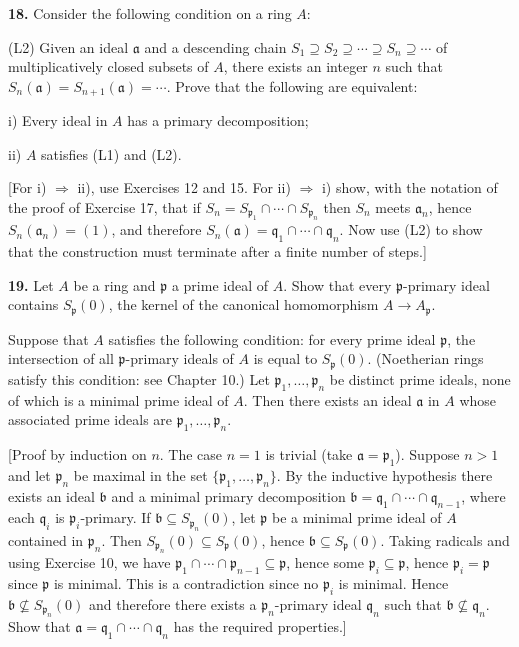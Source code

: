\medskip
\noindent\textbf{18.} Consider the following condition on a ring $A$:

(L2) Given an ideal $\mathfrak a$ and a descending chain $S_1\supseteq S_2\supseteq\cdots\supseteq S_n\supseteq\cdots$
of multiplicatively closed subsets of $A$, there exists an integer $n$ such that $S_n(\mathfrak a)=
S_{n+1}(\mathfrak a)=\cdots$.  Prove that the following are equivalent:

i) Every ideal in $A$ has a primary decomposition;

ii) $A$ satisfies (L1) and (L2).

[For i) $\Rightarrow$ ii), use Exercises 12 and 15.  For ii) $\Rightarrow$ i) show, with the notation of
the proof of Exercise 17, that if $S_n=S_{\mathfrak p_1}\cap\cdots\cap S_{\mathfrak p_n}$ then $S_n$ meets $\mathfrak a_n$, hence
$S_n(\mathfrak a_n)=(1)$, and therefore $S_n(\mathfrak a)=\mathfrak q_1\cap\cdots\cap\mathfrak q_n$.  Now use (L2) to show that
the construction must terminate after a finite number of steps.]

\medskip
\noindent\textbf{19.} Let $A$ be a ring and $\mathfrak p$ a prime ideal of $A$.  Show that every $\mathfrak p$-primary ideal
contains $S_\mathfrak p(0)$, the kernel of the canonical homomorphism $A\longrightarrow A_\mathfrak p$.

Suppose that $A$ satisfies the following condition: for every prime ideal $\mathfrak p$, the
intersection of all $\mathfrak p$-primary ideals of $A$ is equal to $S_\mathfrak p(0)$.  (Noetherian rings
satisfy this condition: see Chapter 10.)  Let $\mathfrak p_1,\ldots,\mathfrak p_n$ be distinct prime ideals,
none of which is a minimal prime ideal of $A$.  Then there exists an ideal $\mathfrak a$ in $A$
whose associated prime ideals are $\mathfrak p_1,\ldots,\mathfrak p_n$.

[Proof by induction on $n$.  The case $n=1$ is trivial (take $\mathfrak a=\mathfrak p_1$).  Suppose
$n>1$ and let $\mathfrak p_n$ be maximal in the set $\{\mathfrak p_1,\ldots,\mathfrak p_n\}$.  By the inductive hypothesis
there exists an ideal $\mathfrak b$ and a minimal primary decomposition $\mathfrak b=\mathfrak q_1\cap\cdots
\cap\mathfrak q_{n-1}$, where each $\mathfrak q_i$ is $\mathfrak p_i$-primary.  If $\mathfrak b\subseteq S_{\mathfrak p_n}(0)$, let $\mathfrak p$ be a minimal prime
ideal of $A$ contained in $\mathfrak p_n$.  Then $S_{\mathfrak p_n}(0)\subseteq S_\mathfrak p(0)$, hence $\mathfrak b\subseteq S_\mathfrak p(0)$.  Taking
radicals and using Exercise 10, we have $\mathfrak p_1\cap\cdots\cap\mathfrak p_{n-1}\subseteq\mathfrak p$, hence some
$\mathfrak p_i\subseteq\mathfrak p$, hence $\mathfrak p_i=\mathfrak p$ since $\mathfrak p$ is minimal.  This is a contradiction since no $\mathfrak p_i$ is
minimal.  Hence $\mathfrak b\nsubseteq S_{\mathfrak p_n}(0)$ and therefore there exists a $\mathfrak p_n$-primary ideal $\mathfrak q_n$
such that $\mathfrak b\nsubseteq\mathfrak q_n$.  Show that $\mathfrak a=\mathfrak q_1\cap\cdots\cap\mathfrak q_n$ has the required properties.]


